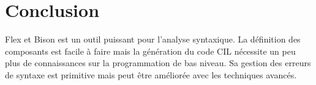 \documentclass[11pt]{article}
\begin{document}
    \hypertarget{conclusion}{%
\section{Conclusion}\label{conclusion}}

Flex et Bison est un outil puissant pour l'analyse syntaxique. La
définition des composants est facile à faire mais la génération du code
CIL nécessite un peu plus de connaissances sur la programmation de bas
niveau. Sa gestion des erreurs de syntaxe est primitive mais peut être
améliorée avec les techniques avancés.


    
    
    
    
\end{document}
